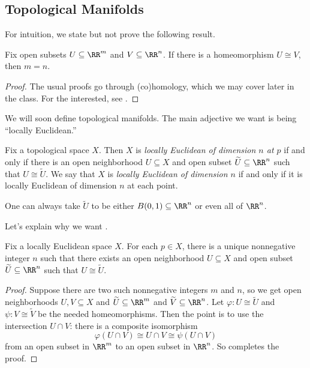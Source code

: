 \documentclass[../notes.tex]{subfiles}
\begin{document}
\subsection{Topological Manifolds}
For intuition, we state but not prove the following result.
\begin{theorem} \label{thm:top-inv-dim}
	Fix open subsets $U\subseteq\RR^m$ and $V\subseteq\RR^n$. If there is a homeomorphism $U\cong V$, then $m=n$.
\end{theorem}
\begin{proof}
	The usual proofs go through (co)homology, which we may cover later in the class. For the interested, see \cite[Proposition~3.50]{elber-alg-top}.
\end{proof}
We will soon define topological manifolds. The main adjective we want is being ``locally Euclidean.''
\begin{definition}
	Fix a topological space $X$. Then $X$ is \textit{locally Euclidean of dimension $n$ at $p$} if and only if there is an open neighborhood $U\subseteq X$ and open subset $\widetilde U\subseteq\RR^n$ such that $U\cong\widetilde U$. We say that $X$ is \textit{locally Euclidean of dimension $n$} if and only if it is locally Euclidean of dimension $n$ at each point.
\end{definition}
\begin{remark} \label{rem:better-chart}
	One can always take $\widetilde U$ to be either $B(0,1)\subseteq\RR^n$ or even all of $\RR^n$.\todo{}
\end{remark}
Let's explain why we want .
\begin{lemma}
	Fix a locally Euclidean space $X$. For each $p\in X$, there is a unique nonnegative integer $n$ such that there exists an open neighborhood $U\subseteq X$ and open subset $\widetilde U\subseteq\RR^n$ such that $U\cong\widetilde U$.
\end{lemma}
\begin{proof}
	Suppose there are two such nonnegative integers $m$ and $n$, so we get open neighborhoods $U,V\subseteq X$ and $\widetilde U\subseteq\RR^m$ and $\widetilde V\subseteq\RR^n$. Let $\varphi\colon U\cong\widetilde U$ and $\psi\colon V\cong\widetilde V$ be the needed homeomorphisms. Then the point is to use the intersection $U\cap V$: there is a composite isomorphism
	\[\varphi(U\cap V)\cong U\cap V\cong\psi(U\cap V)\]
	from an open subset in $\RR^m$ to an open subset in $\RR^n$. So  completes the proof.
\end{proof}
\end{document}
